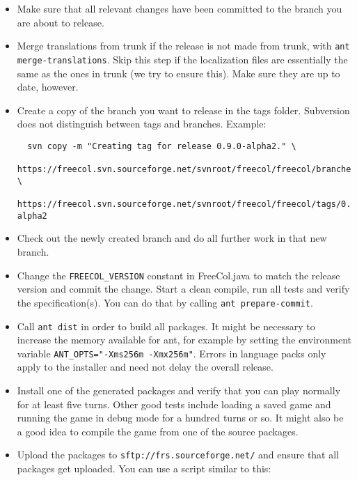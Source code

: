 \documentclass[12pt]{book}
\begin{document}
\begin{itemize}

\item Make sure that all relevant changes have been committed to the
  branch you are about to release.

\item Merge translations from trunk if the release is not made from
  trunk, with \verb+ant merge-translations+. Skip this step if the
  localization files are essentially the same as the ones in trunk (we
  try to ensure this). Make sure they are up to date, however.

\item Create a copy of the branch you want to release in the tags
  folder. Subversion does not distinguish between tags and
  branches. Example:

{\small
\begin{verbatim}
  svn copy -m "Creating tag for release 0.9.0-alpha2." \
  https://freecol.svn.sourceforge.net/svnroot/freecol/freecol/branches/0.9.x \
  https://freecol.svn.sourceforge.net/svnroot/freecol/freecol/tags/0.9.0-alpha2
\end{verbatim}
}

\item Check out the newly created branch and do all further work in that
  new branch.

\item Change the \verb$FREECOL_VERSION$ constant in FreeCol.java to
  match the release version and commit the change. Start a clean
  compile, run all tests and verify the specification(s). You can do
  that by calling \verb+ant prepare-commit+.

\item Call \verb+ant dist+ in order to build all packages. It might be
  necessary to increase the memory available for ant, for example by
  setting the environment variable \verb+ANT_OPTS="-Xms256m -Xmx256m"+.
  Errors in language packs only apply to the installer and need not
  delay the overall release.

\item Install one of the generated packages and verify that you can play
  normally for at least five turns. Other good tests include loading a
  saved game and running the game in debug mode for a hundred turns or
  so. It might also be a good idea to compile the game from one of the
  source packages.

\item Upload the packages to \verb$sftp://frs.sourceforge.net/$ and ensure that
  all packages get uploaded. You can use a script similar to this:


\end{itemize}
\end{document}
